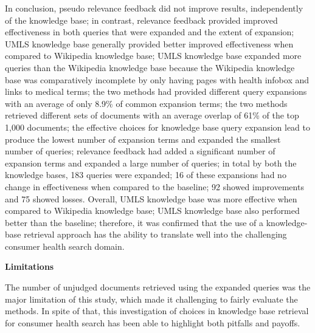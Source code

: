 \documentclass[]{article}
\begin{document}
In conclusion, pseudo relevance feedback did not improve results, independently of the knowledge base; in contrast, relevance feedback provided improved effectiveness in both queries that were expanded and the extent of expansion; UMLS knowledge base generally provided better improved effectiveness when compared to Wikipedia knowledge base; UMLS knowledge base expanded more queries than the Wikipedia knowledge base because the Wikipedia knowledge base was comparatively incomplete by only having pages with health infobox and links to medical terms; the two methods had provided different query expansions with an average of only 8.9\% of common expansion terms;  the two methods retrieved different sets of documents with an average overlap of 61\% of the top 1,000 documents; the effective choices for knowledge base query expansion lead to produce the lowest number of expansion terms and expanded the smallest number of queries; relevance feedback had added a significant number of expansion terms and expanded a large number of queries; in total by both the knowledge bases, 183 queries were expanded; 16 of these expansions had no change in effectiveness when compared to the baseline; 92 showed improvements and 75 showed losses. Overall, UMLS knowledge base was more effective when compared to Wikipedia knowledge base; UMLS knowledge base also performed better than the baseline; therefore, it was confirmed that the use of a knowledge-base retrieval approach has the ability to translate well into the challenging consumer health search domain.                 

\textbf{Limitations}

The number of unjudged documents retrieved using the expanded queries was the major limitation of this study, which made it challenging to fairly evaluate the methods. In spite of that, this investigation of choices in knowledge base retrieval for consumer health search has been able to highlight both pitfalls and payoffs.
 
\end{document}
